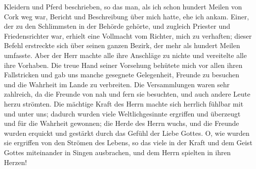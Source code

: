 Kleidern und Pferd beschrieben, so das man, als ich schon 
hundert Meilen von Cork weg war, Bericht und Beschreibung über
mich hatte, ehe ich ankam. Einer, der zu den Schlimmsten in
der Behörde gehörte, und zugleich Priester und Friedensrichter
war, erhielt eine Vollmacht vom Richter, mich zu verhaften; dieser
Befehl erstreckte sich über seinen ganzen Bezirk, der mehr als
hundert Meilen umfasste. Aber der Herr machte alle ihre
Anschläge zu nichte und vereitelte alle ihre Vorhaben. Die treue
Hand seiner Vorsehung behütete mich vor allen ihren Fallstricken
und gab uns manche gesegnete Gelegenheit, Freunde zu besuchen
und die Wahrheit im Lande zu verbreiten. Die Versammlungen
waren sehr zahlreich, da die Freunde von nah und fern sie
besuchten, und auch andere Leute herzu strömten. Die mächtige
Kraft des Herrn machte sich herrlich fühlbar mit und unter uns;
dadurch wurden viele Weltlichgesinnte ergriffen und überzeugt
und für die Wahrheit gewonnen; die Herde des Herrn wuchs,
und die Freunde wurden erquickt und gestärkt durch das Gefühl
der Liebe Gottes. O, wie wurden sie ergriffen von den Strömen
des Lebens, so das viele in der Kraft und dem Geist Gottes
miteinander in Singen ausbrachen, und dem Herrn spielten in
ihren Herzen!

